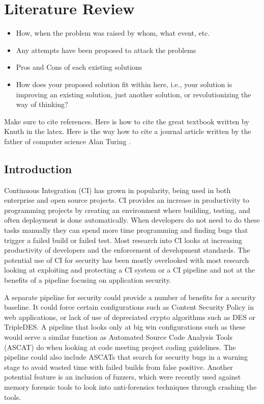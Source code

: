 \section{Literature Review}
\begin{itemize}

\item How, when the problem was raised by whom, what event, etc. 
\item Any attempts have been proposed to attack the problems
\item Pros and Cons of each existing solutions
\item How does your proposed solution fit within here, i.e., your solution is improving an existing solution, just another solution, or revolutionizing the way of thinking?
\end{itemize}

Make sure to cite references. Here is how to cite the great textbook written by Knuth \cite{knuth2006art}in the latex. Here is the way how to cite a journal article written by the father of computer science Alan Turing \cite{turing1950computing}.
\subsection{Introduction}
    Continuous Integration (CI) has grown in popularity, being used in both enterprise and open source projects. CI provides an increase in productivity to programming projects by creating an 
    environment where building, testing, and often deployment is done automatically. When developers do not need to do these tasks manually they can spend more time programming and finding bugs that 
    trigger a failed build or failed test. Most research into CI looks at increasing productivity of developers and the enforcement of development standards. The potential use of CI for security has 
    been mostly overlooked with most research looking at exploiting and protecting a CI system or a CI pipeline and not at the benefits of a pipeline focusing on application security.

	A separate pipeline for security could provide a number of benefits for a security baseline. It could force certain configurations such as Content Security Policy in web applications, or lack of 
    use of depreciated crypto algorithms such as DES or TripleDES\cite{Vehent}. A pipeline that looks only at big win configurations such as these would serve a similar function as Automated Source 
    Code Analysis Tools (ASCAT) do when looking at code meeting project coding guidelines\cite{Zampetti}. The pipeline could also include ASCATs that search for security bugs in a warning stage to 
    avoid wasted time with failed builds from false positive. Another potential feature is an inclusion of fuzzers, which were recently used against memory forensic tools to look into anti-forensics 
    techniques through crashing the tools\cite{Case}.

